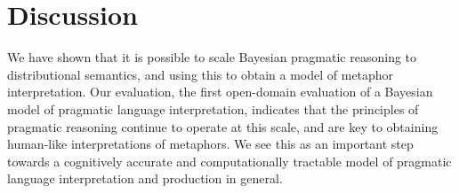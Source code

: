 \documentclass[9pt,twocolumn,twoside,lineno]{pnas-new}
\begin{document}
\section{Discussion} \label{conc} 

	We have shown that it is possible to scale Bayesian pragmatic reasoning to distributional semantics, and using this to obtain a model of metaphor interpretation. Our evaluation, the first open-domain evaluation of a Bayesian model of pragmatic language interpretation, indicates that the principles of pragmatic reasoning continue to operate at this scale, and are key to obtaining human-like interpretations of metaphors. We see this as an important step towards a cognitively accurate and computationally tractable model of pragmatic language interpretation and production in general.








\end{document}
